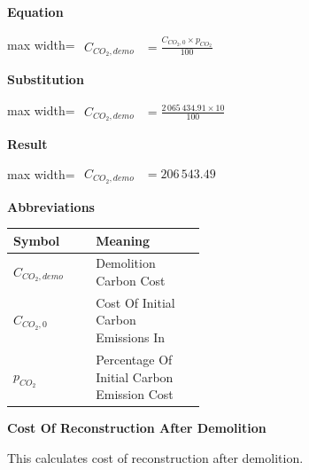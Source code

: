 \documentclass{article}
\begin{document}
\vspace{0.4em}
\textbf{Equation}\par\vspace{-0.35em}
\begin{center}
\begin{adjustbox}{max width=\linewidth}
$\displaystyle\begin{aligned}
C_{CO_2,demo} &= \frac{C_{CO_2,0} \times p_{CO_2}}{100}
\end{aligned}$
\end{adjustbox}
\end{center}
\vspace{0.4em}
\textbf{Substitution}\par\vspace{-0.35em}
\begin{center}
\begin{adjustbox}{max width=\linewidth}
$\displaystyle\begin{aligned}
C_{CO_2,demo} &= \frac{2\,065\,434.91 \times 10}{100}
\end{aligned}$
\end{adjustbox}
\end{center}
\vspace{0.4em}
\textbf{Result}\par\vspace{-0.35em}
\begin{center}
\begin{adjustbox}{max width=\linewidth}
$\displaystyle\begin{aligned}
C_{CO_2,demo} &= 206\,543.49
\end{aligned}$
\end{adjustbox}
\end{center}
\vspace{0.4em}
\textbf{Abbreviations}\par\vspace{-0.35em}
\begin{tabularx}{\linewidth}{>{\raggedright\arraybackslash}p{0.43\linewidth} >{\raggedright\arraybackslash}X}
\toprule
Symbol & Meaning \\
\midrule
$C_{CO_2,demo}$ & Demolition Carbon Cost \\
$C_{CO_2,0}$ & Cost Of Initial Carbon Emissions In \\
$p_{CO_2}$ & Percentage Of Initial Carbon Emission Cost \\
\bottomrule
\end{tabularx}
\vspace{0.6em}
\vspace{0.4em}
\textbf{Cost Of Reconstruction After Demolition}\par\vspace{-0.35em}
This calculates cost of reconstruction after demolition.
\end{document}
